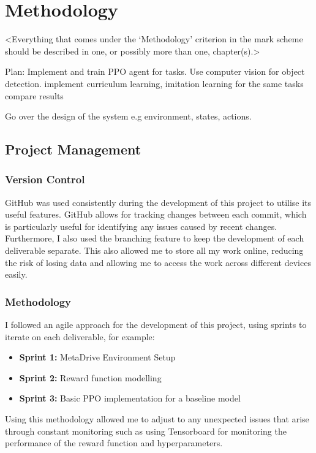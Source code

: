\chapter{Methodology}
\label{chapter2}

<Everything that comes under the `Methodology' criterion in the mark scheme should be described in one, or possibly more than one, chapter(s).>

Plan:
Implement and train PPO agent for tasks.
Use computer vision for object detection.
implement curriculum learning, imitation learning for the same tasks
compare results

Go over the design of the system e.g environment, states, actions.


\section{Project Management}
\subsection{Version Control}
GitHub was used consistently during the development of this project to utilise its useful features. GitHub allows for tracking changes between each commit, which is particularly useful for identifying any issues caused by recent changes. Furthermore, I also used the branching feature to keep the development of each deliverable separate. This also allowed me to store all my work online, reducing the risk of losing data and allowing me to access the work across different devices easily.

\subsection{Methodology}
I followed an agile approach for the development of this project, using sprints to iterate on each deliverable, for example:

\begin{itemize}
    \item \textbf{Sprint 1:} MetaDrive Environment Setup
    \item \textbf{Sprint 2:} Reward function modelling
    \item \textbf{Sprint 3:} Basic PPO implementation for a baseline model
\end{itemize}

Using this methodology allowed me to adjust to any unexpected issues that arise through constant monitoring such as using Tensorboard for monitoring the performance of the reward function and hyperparameters.

